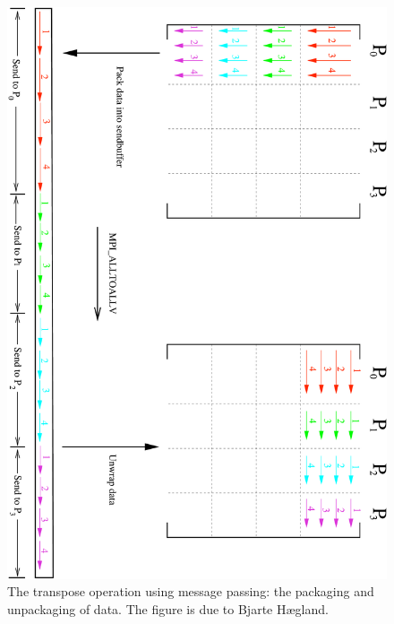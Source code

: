 \begin{figure}[htbp]
  \centering
  \includegraphics[width=\textwidth]{illustrations/matrix_blocktranspose.pdf}
  \caption{The transpose operation using message passing: the packaging and unpackaging of data. The figure is due to Bjarte Hægland.}
  \label{fig:send_transpose}
\end{figure}








